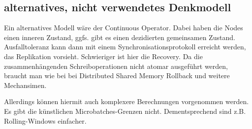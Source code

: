 \subsection[alternatives, nicht verwendetes
Denkmodell]{\rmfamily alternatives, nicht
verwendetes Denkmodell}
Ein alternatives Modell wäre der Continuous Operator. Dabei haben die
Nodes einen inneren Zustand, ggfs. gibt es einen dezidierten
gemeinsamen Zustand. Ausfalltoleranz kann dann mit einem
Synchronisationsprotokoll erreicht werden, das Replikation vorsieht.
Schwieriger ist hier die Recovery. Da die zusammenhängenden
Schreiboperationen nicht atomar ausgeführt werden, braucht man wie bei
bei Distributed Shared Memory Rollback und weitere Mechansimen.

Allerdings können hiermit auch komplexere Berechnungen vorgenommen
werden. Es gibt die künstlichen Microbatches-Grenzen nicht.
Dementsprechend sind z.B. Rolling-Windows einfacher. 